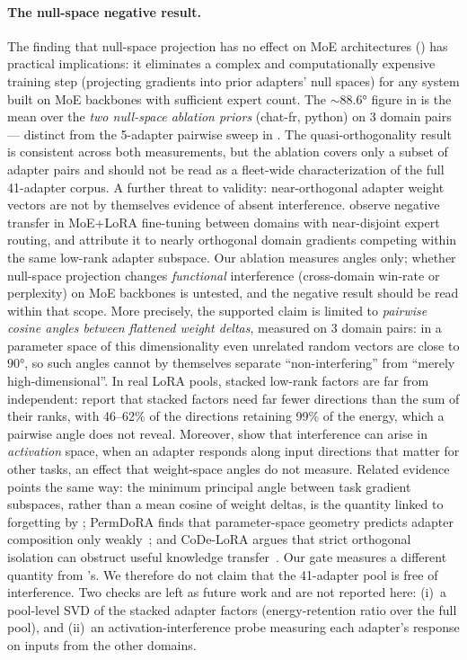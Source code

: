 \documentclass[11pt,a4paper]{article}
\begin{document}
\paragraph{The null-space negative result.}
The finding that null-space projection has no effect on MoE architectures () has practical implications: it eliminates a complex and computationally expensive training step (projecting gradients into prior adapters' null spaces) for any system built on MoE backbones with sufficient expert count. The ${\sim}88.6$° figure in  is the mean over the \emph{two null-space ablation priors} (chat-fr, python) on 3 domain pairs --- distinct from the 5-adapter pairwise sweep in . The quasi-orthogonality result is consistent across both measurements, but the ablation covers only a subset of adapter pairs and should not be read as a fleet-wide characterization of the full 41-adapter corpus. A further threat to validity: near-orthogonal adapter weight vectors are not by themselves evidence of absent interference. \citet{chowdhury2026routingnotenough} observe negative transfer in MoE+LoRA fine-tuning between domains with near-disjoint expert routing, and attribute it to nearly orthogonal domain gradients competing within the same low-rank adapter subspace. Our ablation measures angles only; whether null-space projection changes \emph{functional} interference (cross-domain win-rate or perplexity) on MoE backbones is untested, and the negative result should be read within that scope. More precisely, the supported claim is limited to \emph{pairwise cosine angles between flattened weight deltas}, measured on 3 domain pairs: in a parameter space of this dimensionality even unrelated random vectors are close to $90$°, so such angles cannot by themselves separate ``non-interfering'' from ``merely high-dimensional''. In real LoRA pools, stacked low-rank factors are far from independent: \citet{sathiyalogeswaran2026loraspace} report that stacked factors need far fewer directions than the sum of their ranks, with 46--62\% of the directions retaining 99\% of the energy, which a pairwise angle does not reveal. Moreover, \citet{yoo2026spacelora} show that interference can arise in \emph{activation} space, when an adapter responds along input directions that matter for other tasks, an effect that weight-space angles do not measure. Related evidence points the same way: the minimum principal angle between task gradient subspaces, rather than a mean cosine of weight deltas, is the quantity linked to forgetting by \citet{steele2026subspace}; PermDoRA finds that parameter-space geometry predicts adapter composition only weakly~\citep{sivaramakrishnan2026permdora}; and CoDe-LoRA argues that strict orthogonal isolation can obstruct useful knowledge transfer~\citep{liu2026codelora}. Our gate measures a different quantity from \citeauthor{steele2026subspace}'s. We therefore do not claim that the 41-adapter pool is free of interference. Two checks are left as future work and are not reported here: (i)~a pool-level SVD of the stacked adapter factors (energy-retention ratio over the full pool), and (ii)~an activation-interference probe measuring each adapter's response on inputs from the other domains.
\end{document}
